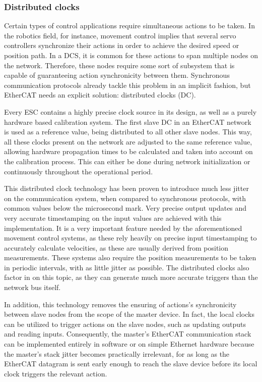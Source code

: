 \subsubsection{Distributed clocks}

Certain types of control applications require simultaneous actions to be taken.
In the robotics field, for instance, movement control implies that several servo controllers synchronize their actions in order to  achieve the desired speed or position path.
In a DCS, it is common for these actions to span multiple nodes on the network.
Therefore, these nodes require some sort of subsystem that is capable of guaranteeing action synchronicity between them.
Synchronous communication protocols already tackle this problem in an implicit fashion, but EtherCAT needs an explicit solution: distributed clocks (DC).

Every ESC contains a highly precise clock source in its design, as well as a purely hardware based calibration system.
The first slave DC in an EtherCAT network is used as a reference value, being distributed to all other slave nodes.
This way, all these clocks present on the network are adjusted to the same reference value, allowing hardware propagation times to be calculated and taken into account on the calibration process.
This can either be done during network initialization or continuously throughout the operational period.

This distributed clock technology has been proven to introduce much less jitter on the communication system, when compared to synchronous protocols, with common values below the microsecond mark.
Very precise output updates and very accurate timestamping on the input values are achieved with this implementation.
It is a very important feature needed by the aforementioned movement control systems, as these rely heavily on precise input timestamping to accurately calculate velocities, as these are usually derived from position measurements.
These systems also require the position measurements to be taken in periodic intervals, with as little jitter as possible.
The distributed clocks also factor in on this topic, as they can generate much more accurate triggers than the network bus itself.

In addition, this technology removes the ensuring of actions's synchronicity between slave nodes from the scope of the master device.
In fact, the local clocks can be utilized to trigger actions on the slave nodes, such as updating outputs and reading inputs.
Consequently, the master's EtherCAT communication stack can be implemented entirely in software or on simple Ethernet hardware because the master's stack jitter becomes practically irrelevant, for as long as the EtherCAT datagram is sent early enough to reach the slave device before its local clock triggers the relevant action.

